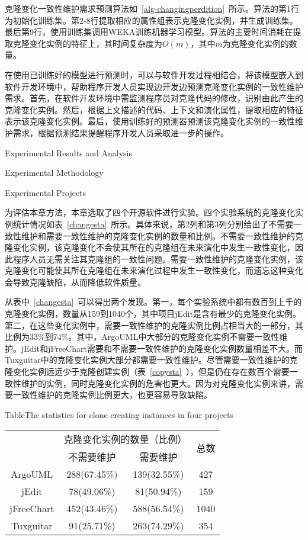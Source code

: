 克隆变化一致性维护需求预测算法如~\ref{alg-changingperdition}~所示。算法的第1行为初始化训练集。第2-8行提取相应的属性组表示克隆变化实例，并生成训练集。最后第9行，使用训练集调用WEKA训练机器学习模型。算法的主要时间消耗在提取克隆变化实例的特征上，其时间复杂度为$O(m)$，其中$m$为克隆变化实例的数量。

在使用已训练好的模型进行预测时，可以与软件开发过程相结合，将该模型嵌入到软件开发环境中，帮助程序开发人员实现边开发边预测克隆变化实例的一致性维护需求。首先，在软件开发环境中需监测程序员对克隆代码的修改，识别由此产生的克隆变化实例。然后，根据上文描述的代码、上下文和演化属性，提取相应的特征表示该克隆变化实例。最后，使用训练好的预测器预测该克隆变化实例的一致性维护需求，根据预测结果提醒程序开发人员采取进一步的操作。

{Experimental Results and Analysis}

{Experimental Methodology}

{Experimental Projects}

为评估本章方法，本章选取了四个开源软件进行实验。四个实验系统的克隆变化实例统计情况如表~\ref{changesta}~所示。具体来说，第2列和第3列分别给出了不需要一致性维护和需要一致性维护的克隆变化实例的数量和比例。不需要一致性维护的克隆变化实例，该克隆变化不会使其所在的克隆组在未来演化中发生一致性变化，因此程序人员无需关注其克隆组的一致性问题。需要一致性维护的克隆变化实例，该克隆变化可能使其所在克隆组在未来演化过程中发生一致性变化，而遗忘这种变化会导致克隆缺陷，从而降低软件质量。

从表中~\ref{changesta}~可以得出两个发现。第一，每个实验系统中都有数百到上千的克隆变化实例，数量从159到1040个，其中项目{jEdit}是含有最少的克隆变化实例。第二，在这些变化实例中，需要一致性维护的克隆实例比例占相当大的一部分，其比例为33\%到74\%。其中，ArgoUML中大部分的克隆变化实例不需要一致性维护。jEdit和jFreeChart需要和不需要一致性维护的克隆变化实例数量相差不大。而Tuxguitar中的克隆变化实例大部分都需要一致性维护。尽管需要一致性维护的克隆变化实例远远少于克隆创建实例（表~\ref{copysta}~），但是仍在存在数百个需要一致性维护的实例，同时克隆变化实例的危害也更大。因为对克隆变化实例来讲，需要一致性维护的克隆实例比例更大，也更容易导致缺陷。

\begin{table}[htbp]
{Table$\!$}{The statistics for clone creating instances in four projects}
\vspace{0.5em}
\centering
\wuhao
\begin{tabular}{cccc}
\toprule[1.5pt]
~\multirow{2}{*}{实验系统}& \multicolumn{2}{c}{克隆变化实例的数量（比例）} & \multirow{2}{*}{总数}\\ 
 \cline{2-3}
~&{不需要维护} &{需要维护} & ~\\
\midrule[1pt]
ArgoUML&288(67.45\%)&139(32.55\%)&427\\
jEdit&78(49.06\%)&81(50.94\%)&159\\
jFreeChart&452(43.46\%)&588(56.54\%)&1040\\
Tuxguitar&91(25.71\%)&263(74.29\%)&354\\
\bottomrule[1.5pt]
\end{tabular}
\end{table}

